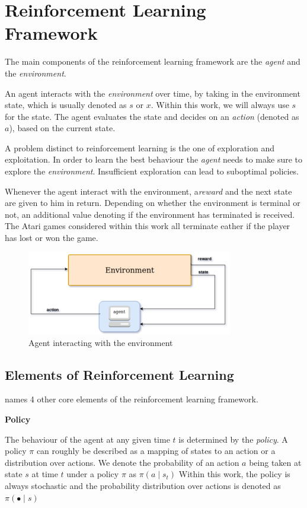 \section{Reinforcement Learning Framework}\raggedbottom 
The main components of the reinforcement learning framework are the \textit{agent} and the \textit{environment}.

An agent interacts with the \textit{environment} over time, by taking in the environment state, which is usually denoted as $s$ or $x$. Within this work, we will always use $s$ for the state.
The agent evaluates the state and decides on an \textit{action} (denoted as $a$), based on the current state. 

A  problem distinct to reinforcement learning is the one of exploration and exploitation. In order to learn the best behaviour the \textit{agent} needs to make sure to explore the \textit{environment}. Insufficient exploration can lead to suboptimal policies.

Whenever the agent interact with the environment, a\textit{reward} and the next state are given to him in return.
Depending on whether the environment is terminal or not, an additional value denoting if the environment has terminated is received. 
The Atari games considered within this work all terminate eather if the player has lost or won the game.

\begin{figure}
\includegraphics[width=90mm]{bilder/RLFramework.png}
\caption{Agent interacting with the environment}
\end{figure}


\subsection{Elements of Reinforcement Learning}
\citet{Sut98} names 4 other core elements of the reinforcement learning framework.

\textbf{Policy}

The behaviour of the agent at any given time $t$ is determined by the \textit{policy}. A policy $\pi$ can roughly be described as a mapping of states to an action or a distribution over actions. 
We denote the probability of an action $a$ being taken at state $s$ at time $t$ under a policy $\pi$ as $ \pi(a \mid s_t) $ 
Within this work, the policy is always stochastic and the probability distribution over actions is denoted as $\pi (\bullet \mid s)$

